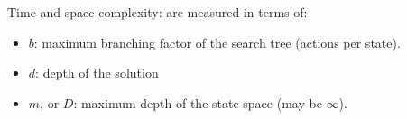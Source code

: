 Time and space complexity: are measured in terms of:
\begin{itemize}
  \item $b$: maximum branching factor of the search tree (actions
    per state).
  \item $d$: depth of the solution
  \item $m$, or $D$: maximum depth of the state space (may be
    $\infty$).
\end{itemize}
